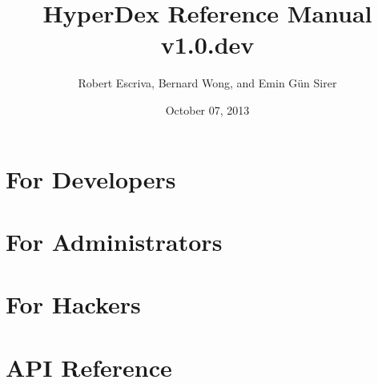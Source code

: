 \documentclass[10pt,oneside]{book}
\title{HyperDex Reference Manual v1.0.dev}
\date{October 07, 2013}
\author{Robert Escriva, Bernard Wong, and Emin Gün Sirer}
\begin{document}
\frontmatter
\maketitle
\tableofcontents

\mainmatter




\part{For Developers}
\label{part:for-developers}






\part{For Administrators}
\label{part:for-admins}


\part{For Hackers}
\label{part:for-hackers}


\part{API Reference}
\label{part:api-ref}


\backmatter


\end{document}

